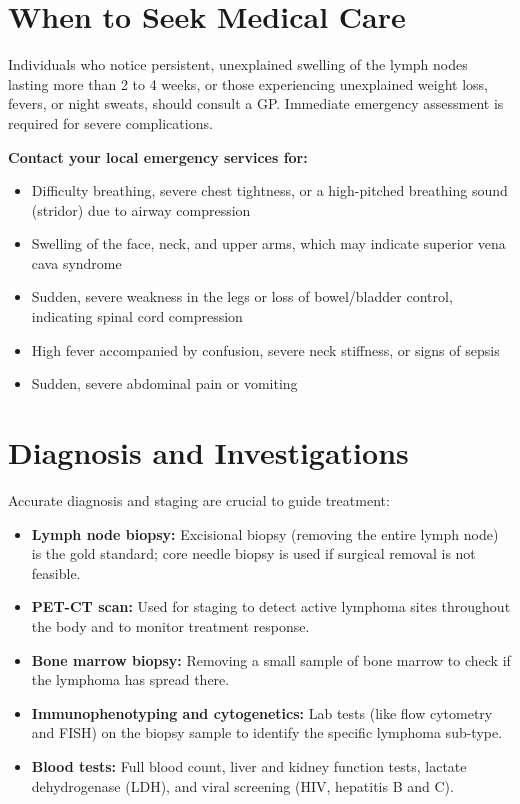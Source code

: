 \section*{When to Seek Medical Care}
Individuals who notice persistent, unexplained swelling of the lymph nodes lasting more than 2 to 4 weeks, or those experiencing unexplained weight loss, fevers, or night sweats, should consult a GP. Immediate emergency assessment is required for severe complications.

\textbf{Contact your local emergency services for:}
\begin{itemize}
    \item Difficulty breathing, severe chest tightness, or a high-pitched breathing sound (stridor) due to airway compression
    \item Swelling of the face, neck, and upper arms, which may indicate superior vena cava syndrome
    \item Sudden, severe weakness in the legs or loss of bowel/bladder control, indicating spinal cord compression
    \item High fever accompanied by confusion, severe neck stiffness, or signs of sepsis
    \item Sudden, severe abdominal pain or vomiting
\end{itemize}

\section*{Diagnosis and Investigations}
Accurate diagnosis and staging are crucial to guide treatment:

\begin{itemize}
    \item \textbf{Lymph node biopsy:} Excisional biopsy (removing the entire lymph node) is the gold standard; core needle biopsy is used if surgical removal is not feasible.
    \item \textbf{PET-CT scan:} Used for staging to detect active lymphoma sites throughout the body and to monitor treatment response.
    \item \textbf{Bone marrow biopsy:} Removing a small sample of bone marrow to check if the lymphoma has spread there.
    \item \textbf{Immunophenotyping and cytogenetics:} Lab tests (like flow cytometry and FISH) on the biopsy sample to identify the specific lymphoma sub-type.
    \item \textbf{Blood tests:} Full blood count, liver and kidney function tests, lactate dehydrogenase (LDH), and viral screening (HIV, hepatitis B and C).
\end{itemize}

